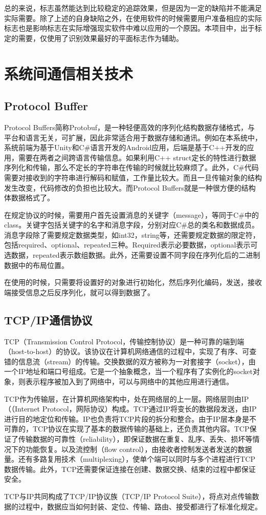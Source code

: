 总的来说，标志虽然能达到比较稳定的追踪效果，但是因为一定的缺陷并不能满足实际需要。除了上述的自身缺陷之外，在使用软件的时候需要用户准备相应的实际标志也是影响标志在实际增强现实软件中难以应用的一个原因。本项目中，出于标定的需要，仅使用了识别效果最好的平面标志作为辅助。

\section{系统间通信相关技术}
\subsection{Protocol Buffer}
Protocol Buffers简称Protobuf，是一种轻便高效的序列化结构数据存储格式，与平台和语言无关，可扩展，因此非常适合用于数据存储和通讯。例如在本系统中，系统前端为基于Unity和C\#语言开发的Android应用，后端是基于C++开发的应用，需要在两者之间跨语言传输信息。如果利用C++ struct定长的特性进行数据序列化和传输，那么不定长的字符串在传输的时候就比较麻烦了。此外，C\#代码需要对接收到的字符串进行解码和赋值，工作量比较大。而且一旦传输对象的结构发生改变，代码修改的负担也比较大。而Protocol Buffers就是一种很方便的结构体数据格式了。

在规定协议的时候，需要用户首先设置消息的关键字（message），等同于C\#中的class。关键字包括关键字的名字和消息字段，分别对应C\#总的类名和数据成员。消息字段除了需要规定数据类型，如int32，string等，还需要规定数据的限定符，包括required、optional、repeated三种。Required表示必要数据，optional表示可选数据，repeated表示数组数据。此外，还需要设置不同字段在序列化后的二进制数据中的布局位置。

在使用的时候，只需要将设置好的对象进行初始化，然后序列化编码，发送，接收端接受信息之后反序列化，就可以得到数据了。

\subsection{TCP/IP通信协议}
	TCP（Transmission Control Protocol，传输控制协议）是一种可靠的端到端（host-to-host）的协议。该协议在计算机网络通信的过程中，实现了有序、可查错的信息流（stream）的传输。交换数据的双方被称为一对套接字（socket），由一个IP地址和端口号组成。它是一个抽象概念，当一个程序有了实例化的socket对象，则表示程序被加入到了网络中，可以与网络中的其他应用进行通信。
	
	TCP作为传输层，在计算机网络架构中，处在网络层的上一层。网络层则由IP（（Internet Protocol，网际协议）构成。TCP通过IP将变长的数据段发送，由IP进行目的地定位和传输。IP也负责将TCP片段的拆分和整合。由于IP层本身是不可靠的，TCP协议在实现了基本的数据传输的基础上，还负责其他内容。TCP保证了传输数据的可靠性（reliability），即保证数据在重复、乱序、丢失、损坏等情况下的功能恢复。以及流控制（flow control），由接收者控制发送者发送的数据量。还有多路复用技术（multiplexing），使单个端可以同时与多个进程进行TCP数据传输。此外，TCP还需要保证连接在创建、数据交换、结束的过程中都保证安全。
	
	TCP与IP共同构成了TCP/IP协议族（TCP/IP Protocol Suite），将点对点传输数据的过程中，数据应当如何封装、定位、传输、路由、接受都进行了标准化规定。